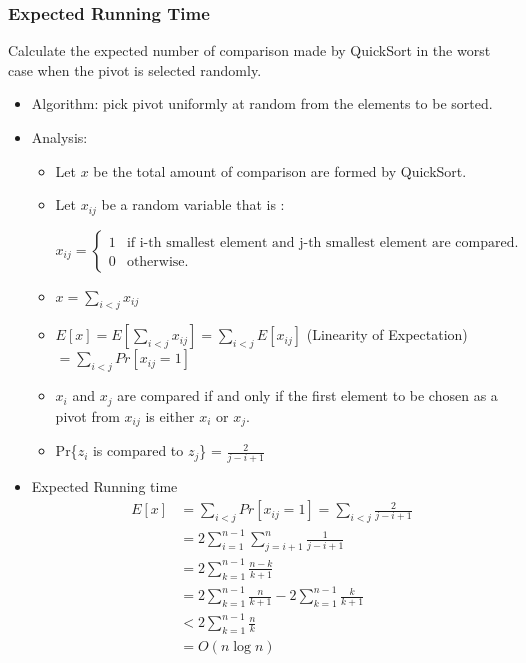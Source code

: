\subsubsection{Expected Running Time}
Calculate the expected number of comparison made by QuickSort in the worst 
case when the pivot is selected randomly.
\begin{itemize}
	\item Algorithm: pick pivot uniformly at random from the elements to be
	sorted.
	\item Analysis:
	\begin{itemize}
		\item Let $x$ be the total amount of comparison are formed by QuickSort. 
		\item Let $x_{ij}$ be a random variable that is : 
		
		$$x_{ij}=
		\begin{cases}
		1 & \text{if i-th smallest element and j-th smallest element are compared.}\\
		0 & \text{otherwise.}
		\end{cases}
		$$
		\item $x=\sum_{i<j}x_{ij}$
		\item $E[x]=E[\sum_{i<j}x_{ij}]=\sum_{i<j}E[x_{ij}]$ (Linearity of Expectation)
		$=\sum_{i<j}Pr[x_{ij}=1]$
		\item $x_{i}$ and $x_{j}$ are compared if and only if the first element
		to be chosen as a pivot from $x_{ij}$ is either $x_{i}$ or $x_{j}$.
		\item Pr\{$z_{i}$ is compared to $z_{j}$\} = $\frac{2}{j-i+1}$
	\end{itemize}
	\item 
	Expected 
	Running time
	\begin{align*}
	E[x]&=\sum_{i<j}Pr[x_{ij}=1]
	=\sum_{i<j}\frac{2}{j-i+1}\\
	&=2\sum_{i=1}^{n-1} \sum_{j=i+1}^n \frac{1}{j-i+1}\\
	&=2\sum_{k=1}^{n-1} \frac{n-k}{k+1}\\
	&= 2\sum_{k=1}^{n-1} \frac{n}{k+1} - 2\sum_{k=1}^{n-1}\frac{k}{k+1}\\
	&< 2 \sum_{k=1}^{n-1} \frac{n}{k}\\
	&= O(n\log n)
	\end{align*}
\end{itemize}